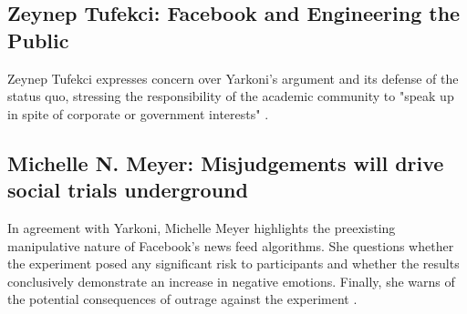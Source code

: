 \subsection{Zeynep Tufekci: Facebook and Engineering the Public}
Zeynep Tufekci expresses concern over Yarkoni's argument and its defense of the status quo, stressing the responsibility of the academic community to "speak up in spite of corporate or government interests" \cite{engineering}.

\subsection{Michelle N. Meyer: Misjudgements will drive social trials underground}
In agreement with Yarkoni, Michelle Meyer highlights the preexisting manipulative nature of Facebook's news feed algorithms.  She questions whether the experiment posed any significant risk to participants and whether the results conclusively demonstrate an increase in negative emotions.  Finally, she warns of the potential consequences of outrage against the experiment \cite{misjudgements}.
\vspace{0.4cm}